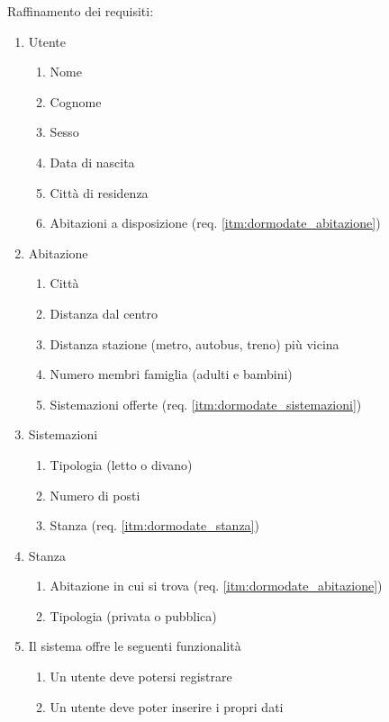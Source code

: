 Raffinamento dei requisiti:
\begin{enumerate}
    \item Utente
    \begin{enumerate}
        \item Nome
        \item Cognome
        \item Sesso
        \item Data di nascita
        \item Citt\`a di residenza
        \item Abitazioni a disposizione (req. \ref{itm:dormodate_abitazione})
    \end{enumerate}
    \item \label{itm:dormodate_abitazione} Abitazione
    \begin{enumerate}
        \item Citt\`a
        \item Distanza dal centro
        \item Distanza stazione (metro, autobus, treno) pi\`u vicina
        \item Numero membri famiglia (adulti e bambini)
        \item Sistemazioni offerte (req. \ref{itm:dormodate_sistemazioni})
    \end{enumerate}
    \item \label{itm:dormodate_sistemazioni} Sistemazioni
    \begin{enumerate}
        \item Tipologia (letto o divano)
        \item Numero di posti
        \item Stanza (req. \ref{itm:dormodate_stanza})
    \end{enumerate}
    \item \label{itm:dormodate_stanza} Stanza
    \begin{enumerate}
        \item Abitazione in cui si trova (req. \ref{itm:dormodate_abitazione})
        \item Tipologia (privata o pubblica)
    \end{enumerate}
    \item Il sistema offre le seguenti funzionalit\`a
    \begin{enumerate}
        \item Un utente deve potersi registrare
        \item Un utente deve poter inserire i propri dati
    \end{enumerate}
\end{enumerate}

